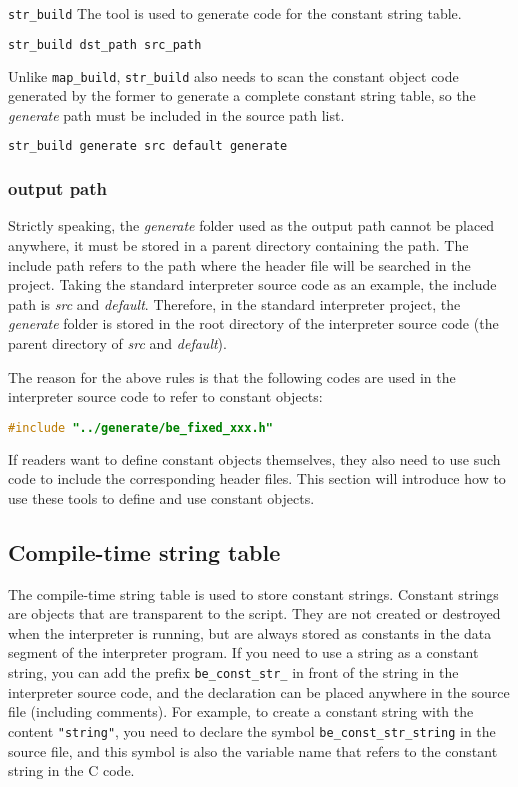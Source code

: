 \texttt{str\_build} The tool is used to generate code for the constant string table.
\begin{lstlisting}[language=bash, numbers=none]
str_build dst_path src_path
\end{lstlisting}
Unlike \texttt{map\_build}, \texttt{str\_build} also needs to scan the constant object code generated by the former to generate a complete constant string table, so the \textsl{generate} path must be included in the source path list.
\begin{lstlisting}[language=bash, numbers=none]
str_build generate src default generate
\end{lstlisting}

\subsubsection {output path}

Strictly speaking, the \textsl{generate} folder used as the output path cannot be placed anywhere, it must be stored in a parent directory containing the path. The include path refers to the path where the header file will be searched in the project. Taking the standard interpreter source code as an example, the include path is \textsl{src} and \textsl{default}. Therefore, in the standard interpreter project, the \textsl{generate} folder is stored in the root directory of the interpreter source code (the parent directory of \textsl{src} and \textsl{default}).

The reason for the above rules is that the following codes are used in the interpreter source code to refer to constant objects:
\begin{lstlisting}[language=c, numbers=none]
#include "../generate/be_fixed_xxx.h"
\end{lstlisting}

If readers want to define constant objects themselves, they also need to use such code to include the corresponding header files. This section will introduce how to use these tools to define and use constant objects.

\subsection{Compile-time string table}

The compile-time string table is used to store constant strings. Constant strings are objects that are transparent to the script. They are not created or destroyed when the interpreter is running, but are always stored as constants in the data segment of the interpreter program. If you need to use a string as a constant string, you can add the prefix \texttt{be\_const\_str\_} in front of the string in the interpreter source code, and the declaration can be placed anywhere in the source file (including comments). For example, to create a constant string with the content \texttt{"string"}, you need to declare the symbol \texttt{be\_const\_str\_string} in the source file, and this symbol is also the variable name that refers to the constant string in the C code.

